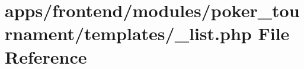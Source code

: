 \hypertarget{frontend_2modules_2poker__tournament_2templates_2__list_8php}{\section{apps/frontend/modules/poker\-\_\-tournament/templates/\-\_\-list.php File Reference}
\label{frontend_2modules_2poker__tournament_2templates_2__list_8php}
}
